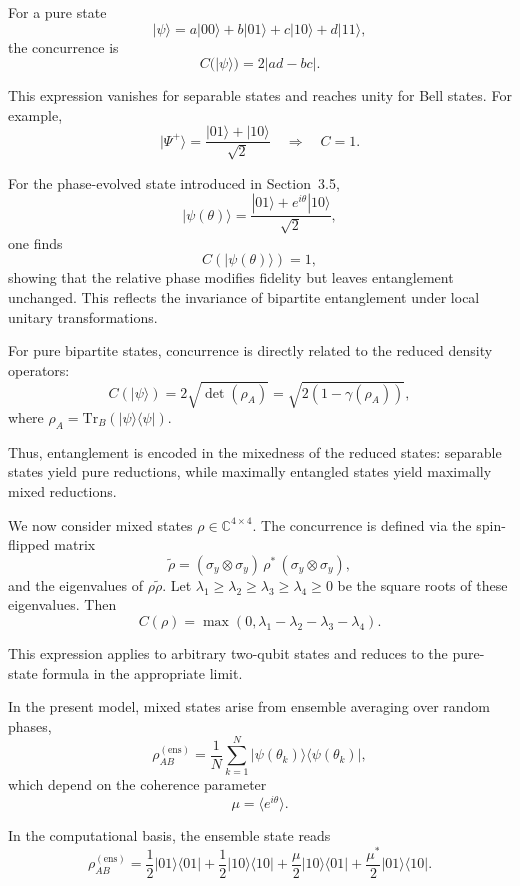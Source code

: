 \documentclass[a4paper]{article}
\begin{document}
\medskip

For a pure state
\[
|\psi\rangle = a|00\rangle + b|01\rangle + c|10\rangle + d|11\rangle,
\]
the concurrence is
\[
C(|\psi\rangle) = 2|ad - bc|.
\]

This expression vanishes for separable states and reaches unity for Bell states. For example,
\[
|\Psi^+\rangle = \frac{|01\rangle + |10\rangle}{\sqrt{2}}
\quad \Rightarrow \quad C = 1.
\]

\medskip

For the phase-evolved state introduced in Section~3.5,
\[
|\psi(\theta)\rangle
=
\frac{|01\rangle + e^{i\theta}|10\rangle}{\sqrt{2}},
\]
one finds
\[
C(|\psi(\theta)\rangle) = 1,
\]
showing that the relative phase modifies fidelity but leaves entanglement unchanged. This reflects the invariance of bipartite entanglement under local unitary transformations.

\medskip

For pure bipartite states, concurrence is directly related to the reduced density operators:
\[
C(|\psi\rangle)
=
2\sqrt{\det(\rho_A)}
=
\sqrt{2\left(1-\gamma(\rho_A)\right)},
\]
where \( \rho_A = \mathrm{Tr}_B(|\psi\rangle\langle\psi|) \).

Thus, entanglement is encoded in the mixedness of the reduced states: separable states yield pure reductions, while maximally entangled states yield maximally mixed reductions.

\medskip

We now consider mixed states \( \rho \in \mathbb{C}^{4 \times 4} \). The concurrence is defined via the spin-flipped matrix
\[
\tilde{\rho}
=
(\sigma_y \otimes \sigma_y)\,\rho^*\,(\sigma_y \otimes \sigma_y),
\]
and the eigenvalues of \( \rho \tilde{\rho} \). Let \( \lambda_1 \ge \lambda_2 \ge \lambda_3 \ge \lambda_4 \ge 0 \) be the square roots of these eigenvalues. Then
\[
C(\rho)
=
\max\!\left(0,\lambda_1 - \lambda_2 - \lambda_3 - \lambda_4\right).
\]

This expression applies to arbitrary two-qubit states and reduces to the pure-state formula in the appropriate limit.

\medskip

In the present model, mixed states arise from ensemble averaging over random phases,
\[
\rho_{AB}^{(\mathrm{ens})}
=
\frac{1}{N}
\sum_{k=1}^{N}
|\psi(\theta_k)\rangle\langle\psi(\theta_k)|,
\]
which depend on the coherence parameter
\[
\mu = \langle e^{i\theta} \rangle.
\]

In the computational basis, the ensemble state reads
\[
\rho_{AB}^{(\mathrm{ens})}
=
\frac{1}{2}|01\rangle\langle 01|
+
\frac{1}{2}|10\rangle\langle 10|
+
\frac{\mu}{2}|10\rangle\langle 01|
+
\frac{\mu^*}{2}|01\rangle\langle 10|.
\]
\end{document}
